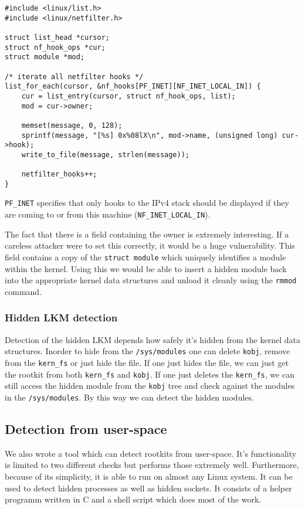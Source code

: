 \documentclass[10pt, letterpaper]{scrartcl}
\begin{document}
\begin{lstlisting}
#include <linux/list.h>
#include <linux/netfilter.h>

struct list_head *cursor;
struct nf_hook_ops *cur;
struct module *mod;

/* iterate all netfilter hooks */
list_for_each(cursor, &nf_hooks[PF_INET][NF_INET_LOCAL_IN]) {
	cur = list_entry(cursor, struct nf_hook_ops, list);
	mod = cur->owner;
	
	memset(message, 0, 128);
	sprintf(message, "[%s] 0x%08lX\n", mod->name, (unsigned long) cur->hook);
	write_to_file(message, strlen(message));
	
	netfilter_hooks++;
}
\end{lstlisting}

\texttt{PF\_INET} specifies that only hooks to the IPv4 stack should be displayed if they are coming to or from this machine (\texttt{NF\_INET\_LOCAL\_IN}).

The fact that there is a field containing the owner is extremely interesting.
If a careless attacker were to set this correctly, it would be a huge vulnerability.
This field contains a copy of the \texttt{struct module} which uniquely identifies a module within the kernel.
Using this we would be able to insert a hidden module back into the appropriate kernel data structures and unload it cleanly using the \texttt{rmmod} command.

\subsubsection{Hidden LKM detection}
Detection of the hidden LKM depends how safely it's hidden from the kernel data structures. 
Inorder to hide from the \texttt{/sys/modules} one can delete \texttt{kobj}, remove from the \texttt{kern\_fs} or just hide the file. 
If one just hides the file, we can just get the rootkit from both \texttt{kern\_fs} and \texttt{kobj}. 
If one just deletes the \texttt{kern\_fs}, we can still access the hidden module from the \texttt{kobj} tree and check 
against the modules in the \texttt{/sys/modules}. By this way we can detect the hidden modules. 


\subsection{Detection from user-space}\label{sec:script}
We also wrote a tool which can detect rootkits from user-space.
It's functionality is limited to two different checks but performs those extremely well.
Furthermore, because of its simplicity, it is able to run on almost any Linux system.
It can be used to detect hidden processes as well as hidden sockets.
It consists of a helper programm written in C and a shell script which does most of the work.
\end{document}
